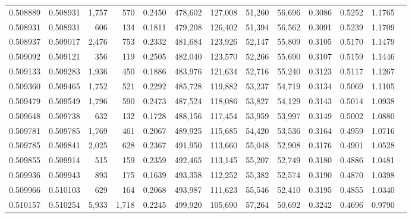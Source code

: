 \begin{tabular}{rrrrrrrrrrrrr}
0.508889 & 0.508931 & 1,757 &   570 &                                     0.2450 & 478,602 & 127,008 &  51,260 &  56,696 & 0.3086 & 0.5252 & 1.1765 \\
0.508931 & 0.508931 &   606 &   134 &                                     0.1811 & 479,208 & 126,402 &  51,394 &  56,562 & 0.3091 & 0.5239 & 1.1709 \\
0.508937 & 0.509017 & 2,476 &   753 &                                     0.2332 & 481,684 & 123,926 &  52,147 &  55,809 & 0.3105 & 0.5170 & 1.1479 \\
0.509092 & 0.509121 &   356 &   119 &                                     0.2505 & 482,040 & 123,570 &  52,266 &  55,690 & 0.3107 & 0.5159 & 1.1446 \\
0.509133 & 0.509283 & 1,936 &   450 &                                     0.1886 & 483,976 & 121,634 &  52,716 &  55,240 & 0.3123 & 0.5117 & 1.1267 \\
0.509360 & 0.509465 & 1,752 &   521 &                                     0.2292 & 485,728 & 119,882 &  53,237 &  54,719 & 0.3134 & 0.5069 & 1.1105 \\
0.509479 & 0.509549 & 1,796 &   590 &                                     0.2473 & 487,524 & 118,086 &  53,827 &  54,129 & 0.3143 & 0.5014 & 1.0938 \\
0.509648 & 0.509738 &   632 &   132 &                                     0.1728 & 488,156 & 117,454 &  53,959 &  53,997 & 0.3149 & 0.5002 & 1.0880 \\
0.509781 & 0.509785 & 1,769 &   461 &                                     0.2067 & 489,925 & 115,685 &  54,420 &  53,536 & 0.3164 & 0.4959 & 1.0716 \\
0.509785 & 0.509841 & 2,025 &   628 &                                     0.2367 & 491,950 & 113,660 &  55,048 &  52,908 & 0.3176 & 0.4901 & 1.0528 \\
0.509855 & 0.509914 &   515 &   159 &                                     0.2359 & 492,465 & 113,145 &  55,207 &  52,749 & 0.3180 & 0.4886 & 1.0481 \\
0.509936 & 0.509943 &   893 &   175 &                                     0.1639 & 493,358 & 112,252 &  55,382 &  52,574 & 0.3190 & 0.4870 & 1.0398 \\
0.509966 & 0.510103 &   629 &   164 &                                     0.2068 & 493,987 & 111,623 &  55,546 &  52,410 & 0.3195 & 0.4855 & 1.0340 \\
0.510157 & 0.510254 & 5,933 & 1,718 &                                     0.2245 & 499,920 & 105,690 &  57,264 &  50,692 & 0.3242 & 0.4696 & 0.9790 \\

\end{tabular}

